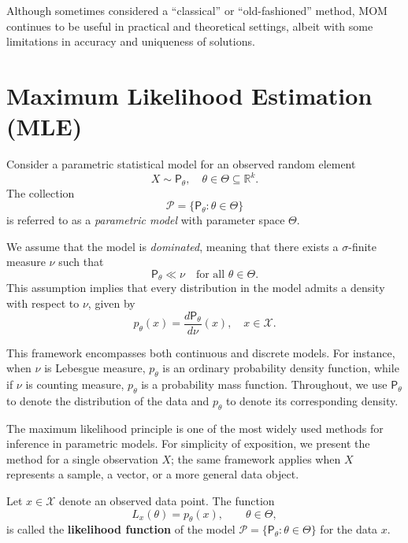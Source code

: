 \begin{note}[]
Although sometimes considered a “classical” or “old-fashioned” method, MOM continues to be useful in practical and theoretical settings, albeit with some limitations in accuracy and uniqueness of solutions.
\end{note}

\section{Maximum Likelihood Estimation (MLE)}
\label{sec:MLE}

Consider a parametric statistical model for an observed random element
\[
    X \sim \mathsf{P}_{\theta}, \quad \theta \in \Theta \subseteq \mathbb{R}^{k}.
\]
The collection
\[
    \mathcal{P} = \{\mathsf{P}_{\theta} : \theta \in \Theta\}
\]
is referred to as a \emph{parametric model} with parameter space \(\Theta\).

We assume that the model is \emph{dominated}, meaning that there exists a
\(\sigma\)-finite measure \(\nu\) such that
\[
    \mathsf{P}_{\theta} \ll \nu \quad \text{for all } \theta \in \Theta.
\]
This assumption implies that every distribution in the model admits a
density with respect to \(\nu\), given by
\[
    p_{\theta}(x)
    = \frac{d \mathsf{P}_{\theta}}{d \nu}(x),
    \quad x \in \mathcal{X}.
\]

This framework encompasses both continuous and discrete models. For
instance, when \(\nu\) is Lebesgue measure, \(p_{\theta}\) is an ordinary
probability density function, while if \(\nu\) is counting measure,
\(p_{\theta}\) is a probability mass function. Throughout, we use
\(\mathsf{P}_{\theta}\) to denote the distribution of the data and
\(p_{\theta}\) to denote its corresponding density.

The maximum likelihood principle is one of the most widely used methods
for inference in parametric models. For simplicity of exposition, we
present the method for a single observation \(X\); the same framework
applies when \(X\) represents a sample, a vector, or a more general data
object.

\begin{definition}
Let \(x \in \mathcal{X}\) denote an observed data point. The function
\[
    L_x(\theta) = p_\theta(x), \qquad \theta \in \Theta,
\]
is called the \textbf{likelihood function} of the model
\(\mathcal{P} = \{\mathsf{P}_\theta : \theta \in \Theta\}\) for the data \(x\).
\end{definition}

